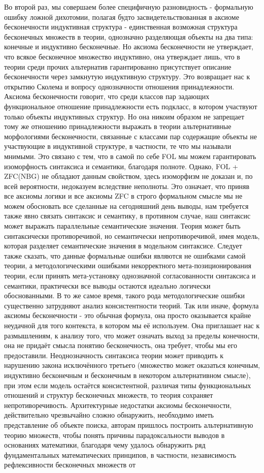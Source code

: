 \documentclass[12pt]{article}
\begin{document}
Во второй раз, мы совершаем более специфичную разновидность - формальную ошибку ложной дихотомии, полагая будто засвидетельствованная в аксиоме бесконечности индуктивная структура - единственная возможная структура бесконечных множеств в теории, однозначно разделяющая объекты на два типа: конечные и индуктивно бесконечные. Но аксиома бесконечности не утверждает, что всякое бесконечное множество индуктивно, она утверждает лишь, что в теории среди прочих альтернатив гарантированно присутствует описание бесконечности через замкнутую индуктивную структуру. Это возвращает нас к открытию Сколема и вопросу однозначности отношения принадлежности. Аксиома бесконечности говорит, что среди классов пар задающих функциональное отношение принадлежности есть подкласс, в котором участвуют только объекты индуктивных структур. Но она никоим образом не запрещает тому же отношению принадлежности выражать в теории альтернативные морфологиями бесконечности, связанные с классами пар содержащие объекты не участвующие в индуктивной структуре, в частности, те что мы называли мнимыми. Это связано с тем, что в самой по себе FOL мы можем гарантировать изоморфность синтаксиса и семантики, благодаря полноте. Однако, FOL + ZFC(NBG) не обладают данным свойством, здесь изоморфизм не доказан и, по всей вероятности, недоказуем вследствие неполноты. Это означает, что приняв все аксиомы логики и все аксиомы ZFC в строго формальном смысле мы не можем обосновать все сделанные на сегодняшний день выводы, нам требуется также явно связать синтаксис и семантику, в противном случае, наш синтаксис может выражать параллельные семантические значения. Теория может быть синтаксически противоречивой, но семантически непротиворечивой, имея модель, которая разделяет семантические значения в модельном синтаксисе. Следует также сказать, что данные формальные ошибки являются не ошибками самой теории, а методологическими ошибками некорректного мета-позиционирования теории, если принять мета-установку однозначной согласованности синтаксиса и семантики, практически все выводы остаются идеально логически обоснованными. В то же самое время, такого рода методологические ошибки существенно затрудняют анализ консистентности теорий. Так или иначе, формула аксиомы бесконечности - это обычная формула, она просто оказывается крайне неудачной для того контекста, в котором мы её используем. Она приглашает нас к размышлениям, к анализу того, что может означать выход за пределы конечности, она не придаёт смысла понятию бесконечность, она требует, чтобы мы его предоставили. Неоднозначность синтаксиса теории может приводить к нарушению закона исключённого третьего (множество может оказаться конечным, индуктивно бесконечным и бесконечным в некотором альтернативном смысле), при этом если модель остаётся консистентной, различая типы функциональных отношений и структур бесконечных множеств, то теория сохраняет непротиворечивость. Архитектурные недостатки аксиомы бесконечности, действительно чрезвычайно сложно обнаружить, необходимо иметь представление об объекте поиска, авторам пришлось построить альтернативную теорию множеств, чтобы понять причины парадоксальности выводов в основаниях математики, благодаря чему удалось обнаружить ряд фундаментальных математических принципов, в частности, независимость рефлексивности бесконечных множеств от 
\end{document}
